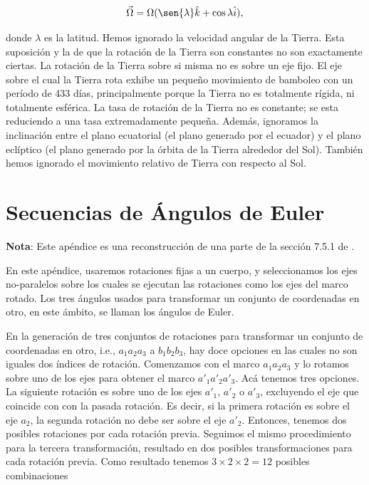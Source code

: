 \documentclass[a4paper,10pt]{article}
\numberwithin{equation}{section}
\begin{document}
\begin{equation}
 \vec{\Omega} = \Omega(\sen{\lambda}\hat{k}+\cos{\lambda}\hat{i}),
 \label{eq:velAngTierra1}
\end{equation}

donde $\lambda$ es la latitud. Hemos ignorado la velocidad angular de la Tierra. Esta 
suposición y la de que la rotación de la Tierra son constantes no son exactamente 
ciertas. La rotación de la Tierra sobre si misma no es sobre un eje fijo. El eje 
sobre el cual la Tierra rota exhibe un pequeño movimiento de bamboleo con un 
período de 433 días, principalmente porque la Tierra no es totalmente rígida, ni 
totalmente esférica. La tasa de rotación de la Tierra no es constante; se esta 
reduciendo a una tasa extremadamente pequeña. Además, ignoramos la inclinación 
entre el plano ecuatorial (el plano generado por el ecuador) y el plano eclíptico 
(el plano generado por la órbita de la Tierra alrededor del Sol). También hemos 
ignorado el movimiento relativo de Tierra con respecto al Sol.

\newpage

\section{Secuencias de Ángulos de Euler} \label{app:apendice2}

\textbf{Nota}: Este apéndice es una reconstrucción de una parte de la sección 7.5.1 
de \cite{baruh}.

\vspace{.3cm}

En este apéndice, usaremos rotaciones fijas a un cuerpo, y seleccionamos 
los ejes no-paralelos sobre los cuales se ejecutan las rotaciones como los ejes 
del marco rotado. Los tres ángulos usados para transformar un conjunto de coordenadas 
en otro, en este ámbito, se llaman los ángulos de Euler.

\vspace{.3cm}

En la generación de tres conjuntos de rotaciones para transformar un conjunto de 
coordenadas en otro, i.e., $a_1a_2a_3$ a $b_1b_2b_3$, hay doce opciones en las cuales 
no son iguales dos índices de rotación. Comenzamos con el marco $a_1a_2a_3$ y lo 
rotamos sobre uno de los ejes para obtener el marco $a'_1a'_2a'_3$. Acá tenemos 
tres opciones. La siguiente rotación es sobre uno de los ejes $a'_1$, $a'_2$ o $a'_3$, 
excluyendo el eje que coincide con con la pasada rotación. Es decir, si la primera 
rotación es sobre el eje $a_2$, la segunda rotación no debe ser sobre el eje $a'_2$. 
Entonces, tenemos dos posibles rotaciones por cada rotación previa. Seguimos el mismo 
procedimiento para la tercera transformación, resultado en dos posibles transformaciones 
para cada rotación previa. Como resultado tenemos $3 \times 2 \times 2 = 12$ posibles 
combinaciones 
\end{document}

